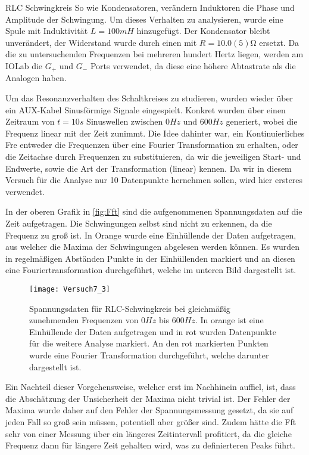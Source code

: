 \documentclass{alex_gp}
\begin{document}
\begin{mybox}{RLC Schwingkreis}
	So wie Kondensatoren, verändern Induktoren die Phase und Amplitude der Schwingung. Um dieses Verhalten zu analysieren, wurde eine Spule mit Induktivität \( L = 100 \unit{mH} \) hinzugefügt. Der Kondensator bleibt unverändert, der Widerstand wurde durch einen mit \( R = 10.0(5) \unit{\ohm} \) ersetzt. Da die zu untersuchenden Frequenzen bei mehreren hundert Hertz liegen, werden am IOLab die \( G_+ \) und \( G_- \) Ports verwendet, da diese eine höhere Abtastrate als die Analogen haben. 
	
	Um das Resonanzverhalten des Schaltkreises zu studieren, wurden wieder über ein AUX-Kabel Sinusförmige Signale eingespielt. Konkret wurden über einen Zeitraum von \( t = 10 \unit{s} \) Sinuswellen zwischen \( 0 \unit{Hz} \) und \( 600 \unit{Hz} \) generiert, wobei die Frequenz linear mit der Zeit zunimmt. Die Idee dahinter war, ein Kontinuierliches Fre
	entweder die Frequenzen über eine Fourier Transformation zu erhalten, oder die Zeitachse durch Frequenzen zu substituieren, da wir die jeweiligen Start- und Endwerte, sowie die Art der Transformation (linear) kennen. Da wir in diesem Versuch für die Analyse nur 10 Datenpunkte hernehmen sollen, wird hier ersteres verwendet. 
	
	In der oberen Grafik in \autoref{fig:Fft} sind die aufgenommenen Spannungsdaten auf die Zeit aufgetragen. Die Schwingungen selbst sind nicht zu erkennen, da die Frequenz zu groß ist. In Orange wurde eine Einhüllende der Daten aufgetragen, aus welcher die Maxima der Schwingungen abgelesen werden können. Es wurden in regelmäßigen Abständen Punkte in der Einhüllenden markiert und an diesen eine Fouriertransformation durchgeführt, welche im unteren Bild dargestellt ist. 
	\begin{figure}[H]	
		\centering
		\texttt{[image: Versuch7\_3]}
		\caption{Spannungsdaten für RLC-Schwingkreis bei gleichmäßig zunehmenden Frequenzen von \( 0 \unit{Hz} \) bis \( 600 \unit{Hz} \). In orange ist eine Einhüllende der Daten aufgetragen und in rot wurden Datenpunkte für die weitere Analyse markiert. An den rot markierten Punkten wurde eine Fourier Transformation durchgeführt, welche darunter dargestellt ist.}
		\label{fig:Fft}
	\end{figure}

	Ein Nachteil dieser Vorgehensweise, welcher erst im Nachhinein auffiel, ist, dass die Abschätzung der Unsicherheit der Maxima nicht trivial ist. Der Fehler der Maxima wurde daher auf den Fehler der Spannungsmessung gesetzt, da sie auf jeden Fall so groß sein müssen, potentiell aber größer sind. Zudem hätte die Fft sehr von einer Messung über ein längeres Zeitintervall profitiert, da die gleiche Frequenz dann für längere Zeit gehalten wird, was zu definierteren Peaks führt. 
	

\end{mybox}
\end{document}
